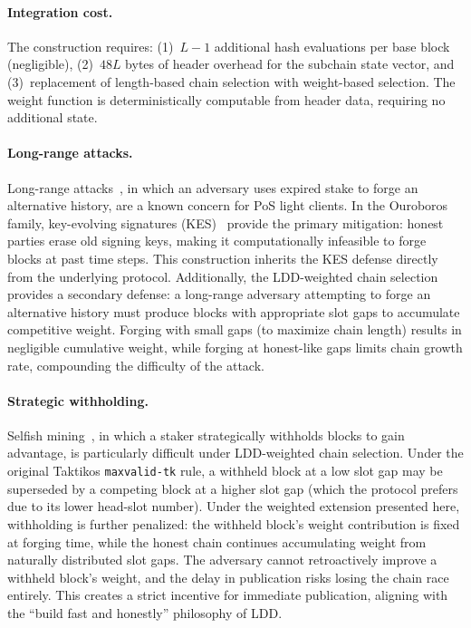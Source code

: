 \documentclass[11pt]{article}
\begin{document}
\paragraph{Integration cost.} The construction requires: (1)~$L-1$ additional hash evaluations per base block (negligible), (2)~$48L$ bytes of header overhead for the subchain state vector, and (3)~replacement of length-based chain selection with weight-based selection. The weight function is deterministically computable from header data, requiring no additional state.

\paragraph{Long-range attacks.} Long-range attacks~\cite{longrange}, in which an adversary uses expired stake to forge an alternative history, are a known concern for PoS light clients. In the Ouroboros family, key-evolving signatures (KES)~\cite{praos} provide the primary mitigation: honest parties erase old signing keys, making it computationally infeasible to forge blocks at past time steps. This construction inherits the KES defense directly from the underlying protocol. Additionally, the LDD-weighted chain selection provides a secondary defense: a long-range adversary attempting to forge an alternative history must produce blocks with appropriate slot gaps to accumulate competitive weight. Forging with small gaps (to maximize chain length) results in negligible cumulative weight, while forging at honest-like gaps limits chain growth rate, compounding the difficulty of the attack.

\paragraph{Strategic withholding.} Selfish mining~\cite{selfish}, in which a staker strategically withholds blocks to gain advantage, is particularly difficult under LDD-weighted chain selection. Under the original Taktikos \texttt{maxvalid-tk} rule, a withheld block at a low slot gap may be superseded by a competing block at a higher slot gap (which the protocol prefers due to its lower head-slot number). Under the weighted extension presented here, withholding is further penalized: the withheld block's weight contribution is fixed at forging time, while the honest chain continues accumulating weight from naturally distributed slot gaps. The adversary cannot retroactively improve a withheld block's weight, and the delay in publication risks losing the chain race entirely. This creates a strict incentive for immediate publication, aligning with the ``build fast and honestly'' philosophy of LDD.
\end{document}
